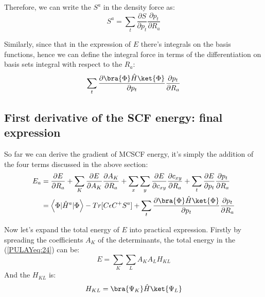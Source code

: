 Therefore, we can write the $S^{a}$ in the density force as:
\begin{equation}\label{}
  S^{a} = \sum_{t}\frac{\partial S}{\partial p_{t}}\frac{\partial
    p_{t}}{\partial R_{a}}
\end{equation}

Similarly, since that in the expression of $E$ there's integrals on
the basis functions, hence we can define the integral force in terms
of the differentiation on basis sets integral with respect to the
$R_{a}$:
\begin{equation}\label{}
  \sum_{t}\frac{\partial \bra{\Phi}\hat{H}\ket{\Phi}}{\partial p_{t}}
  \frac{\partial p_{t}}{\partial R_{a}}
\end{equation}


\subsection{First derivative of the SCF energy: final expression}
%
%
So far we can derive the gradient of MCSCF energy, it's simply the
addition of the four terms discussed in the above section:
\begin{align}\label{PULAYeq:26}
  E_{a} &= \frac{\partial E}{\partial R_{a}} + \sum_{K}\frac{\partial
    E}{\partial A_{K}}\frac{\partial A_{K}}{\partial R_{a}} +
  \sum_{x}\sum_{y}\frac{\partial E}{\partial c_{xy}}\frac{\partial
    c_{xy}}{\partial R_{a}} +\sum_{t}\frac{\partial E}{\partial p_{t}}
  \frac{\partial p_{t}}{\partial R_{a}} \nonumber
  \\
  &=\left\langle\Phi|\hat{H}^{a}|\Phi\right\rangle -Tr[C\epsilon
  C^{+}S^{a}] + \sum_{t}\frac{\partial
    \bra{\Phi}\hat{H}\ket{\Phi}}{\partial p_{t}} \frac{\partial
    p_{t}}{\partial R_{a}}
\end{align}

Now let's expand the total energy of $E$ into practical expression.
Firstly by spreading the coefficients $A_{K}$ of the determinants, the
total energy in the (\ref{PULAYeq:24}) can be:
\begin{equation}\label{}
  E = \sum_{K}\sum_{L}A_{K}A_{L}H_{KL}
\end{equation}
And the $H_{KL}$ is:
\begin{equation}\label{}
  H_{KL} =\bra{\Psi_{K}}\hat{H}\ket{\Psi_{L}}
\end{equation}

